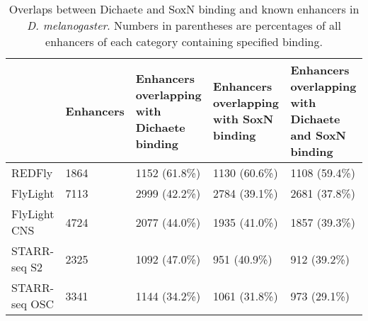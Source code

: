 \begin{table}[h]
\centering
\begin{tabular}{|l|l|p{2.5cm}|p{2.5cm}|p{2.5cm}|}
\hline
              & \textbf{Enhancers} & \textbf{Enhancers overlapping with Dichaete binding} & \textbf{Enhancers overlapping with SoxN binding} & \textbf{Enhancers overlapping with Dichaete and SoxN binding} \\ \hline
REDFly        & 1864      & 1152 (61.8\%)                               & 1130 (60.6\%)                           & 1108 (59.4\%)                                        \\ \hline
FlyLight      & 7113      & 2999 (42.2\%)                               & 2784 (39.1\%)                           & 2681 (37.8\%)                                        \\ \hline
FlyLight CNS  & 4724      & 2077 (44.0\%)                               & 1935 (41.0\%)                           & 1857 (39.3\%)                                        \\ \hline
STARR-seq S2  & 2325      & 1092 (47.0\%)                               & 951 (40.9\%)                            & 912 (39.2\%)                                         \\ \hline
STARR-seq OSC & 3341      & 1144 (34.2\%)                               & 1061 (31.8\%)                           & 973 (29.1\%)                                         \\ \hline
\end{tabular}
\caption{Overlaps between Dichaete and SoxN binding and known enhancers in \emph{D. melanogaster}. Numbers in parentheses are percentages of all enhancers of each category containing specified binding.}
\label{Table 4.9}
\end{table}

